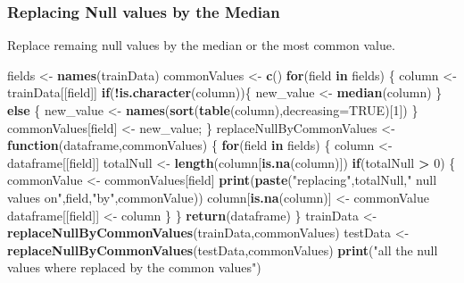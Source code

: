 \documentclass[]{article}
\newenvironment{Shaded}{\begin{snugshade}}{\end{snugshade}}
\newcommand{\KeywordTok}[1]{\textcolor[rgb]{0.13,0.29,0.53}{\textbf{#1}}}
\newcommand{\DataTypeTok}[1]{\textcolor[rgb]{0.13,0.29,0.53}{#1}}
\newcommand{\DecValTok}[1]{\textcolor[rgb]{0.00,0.00,0.81}{#1}}
\newcommand{\StringTok}[1]{\textcolor[rgb]{0.31,0.60,0.02}{#1}}
\newcommand{\OtherTok}[1]{\textcolor[rgb]{0.56,0.35,0.01}{#1}}
\newcommand{\ControlFlowTok}[1]{\textcolor[rgb]{0.13,0.29,0.53}{\textbf{#1}}}
\newcommand{\OperatorTok}[1]{\textcolor[rgb]{0.81,0.36,0.00}{\textbf{#1}}}
\newcommand{\NormalTok}[1]{#1}
\begin{document}
\subsubsection{Replacing Null values by the
Median}\label{replacing-null-values-by-the-median}

Replace remaing null values by the median or the most common value.

\begin{Shaded}
\begin{Highlighting}[]
\NormalTok{fields <-}\StringTok{ }\KeywordTok{names}\NormalTok{(trainData)}
\NormalTok{commonValues <-}\StringTok{ }\KeywordTok{c}\NormalTok{()}
\ControlFlowTok{for}\NormalTok{(field }\ControlFlowTok{in}\NormalTok{ fields) \{}
\NormalTok{  column <-}\StringTok{ }\NormalTok{trainData[[field]]}
  \ControlFlowTok{if}\NormalTok{(}\OperatorTok{!}\KeywordTok{is.character}\NormalTok{(column))\{}
\NormalTok{    new_value <-}\StringTok{ }\KeywordTok{median}\NormalTok{(column)}
\NormalTok{  \} }\ControlFlowTok{else}\NormalTok{ \{}
\NormalTok{    new_value <-}\StringTok{ }\KeywordTok{names}\NormalTok{(}\KeywordTok{sort}\NormalTok{(}\KeywordTok{table}\NormalTok{(column),}\DataTypeTok{decreasing=}\OtherTok{TRUE}\NormalTok{)[}\DecValTok{1}\NormalTok{]) }
\NormalTok{  \}}
\NormalTok{  commonValues[field] <-}\StringTok{ }\NormalTok{new_value;}
\NormalTok{\}}
\NormalTok{replaceNullByCommonValues <-}\StringTok{ }\ControlFlowTok{function}\NormalTok{(dataframe,commonValues) \{}
  \ControlFlowTok{for}\NormalTok{(field }\ControlFlowTok{in}\NormalTok{ fields) \{}
\NormalTok{    column <-}\StringTok{ }\NormalTok{dataframe[[field]]}
\NormalTok{    totalNull <-}\StringTok{ }\KeywordTok{length}\NormalTok{(column[}\KeywordTok{is.na}\NormalTok{(column)])}
    \ControlFlowTok{if}\NormalTok{(totalNull }\OperatorTok{>}\StringTok{ }\DecValTok{0}\NormalTok{) \{}
\NormalTok{      commonValue <-}\StringTok{ }\NormalTok{commonValues[field]}
      \KeywordTok{print}\NormalTok{(}\KeywordTok{paste}\NormalTok{(}\StringTok{"replacing"}\NormalTok{,totalNull,}\StringTok{" null values on"}\NormalTok{,field,}\StringTok{"by"}\NormalTok{,commonValue))}
\NormalTok{      column[}\KeywordTok{is.na}\NormalTok{(column)] <-}\StringTok{ }\NormalTok{commonValue}
\NormalTok{      dataframe[[field]] <-}\StringTok{ }\NormalTok{column}
\NormalTok{    \}}
\NormalTok{  \}}
  \KeywordTok{return}\NormalTok{(dataframe)}
\NormalTok{\}}
\NormalTok{trainData <-}\StringTok{ }\KeywordTok{replaceNullByCommonValues}\NormalTok{(trainData,commonValues)}
\NormalTok{testData  <-}\StringTok{ }\KeywordTok{replaceNullByCommonValues}\NormalTok{(testData,commonValues)}
\KeywordTok{print}\NormalTok{(}\StringTok{"all the null values where replaced by the common values"}\NormalTok{)}
\end{Highlighting}
\end{Shaded}
\end{document}

